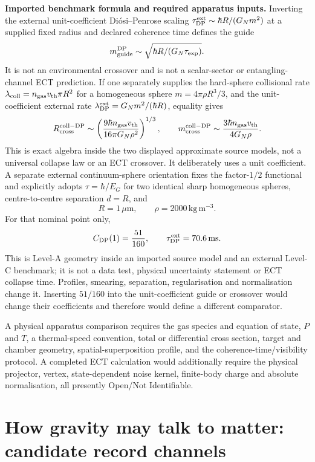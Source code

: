 \documentclass[11pt,a4paper]{article}
\begin{document}
\textbf{Imported benchmark formula and required apparatus inputs.}
Inverting the external unit-coefficient Di\'osi--Penrose scaling
$\tau_{\rm DP}^{\rm ext}\sim\hbar R/(G_Nm^2)$ at a supplied fixed radius and
declared coherence time defines the guide
\[
 m_{\rm guide}^{\rm DP}
 \sim \sqrt{\hbar R/(G_N\tau_{\rm exp})}.
\]
It is not an environmental crossover and is not a scalar-sector or
entangling-channel ECT prediction.  If one separately supplies the hard-sphere
collisional rate $\lambda_{\rm coll}=n_{\rm gas}v_{\rm th}\pi R^2$ for a
homogeneous sphere $m=4\pi\rho R^3/3$, and the unit-coefficient external rate
$\lambda_{\rm DP}^{\rm ext}=G_Nm^2/(\hbar R)$, equality gives
\[
 R_{\rm cross}^{\rm coll-DP}
 \sim\left(\frac{9\hbar n_{\rm gas}v_{\rm th}}
 {16\pi G_N\rho^2}\right)^{1/3},
 \qquad
 m_{\rm cross}^{\rm coll-DP}
 \sim\frac{3\hbar n_{\rm gas}v_{\rm th}}{4G_N\rho}.
\]
This is exact algebra inside the two displayed approximate source models, not
a universal collapse law or an ECT crossover.  It deliberately uses a unit
coefficient.  A separate external continuum-sphere orientation fixes the
factor-$1/2$ functional and explicitly adopts $\tau=\hbar/E_G$ for two identical sharp
homogeneous spheres, centre-to-centre separation $d=R$, and
\[ R=1\,\mu\mathrm m,\qquad \rho=2000\,\mathrm{kg\,m^{-3}}. \]
For that nominal point only,
\[
 C_{\rm DP}(1)=\frac{51}{160},\qquad
 \tau_{\rm DP}^{\rm ext}=70.6\,\mathrm{ms}.
\]
This is Level-A geometry inside an imported source model and an external
Level-C benchmark; it is not a data test, physical uncertainty statement or
ECT collapse time.  Profiles, smearing, separation, regularisation and
normalisation change it.  Inserting $51/160$ into the unit-coefficient guide
or crossover would change their coefficients and therefore would define a
different comparator.

A physical apparatus comparison requires the gas species and equation of
state, $P$ and $T$, a thermal-speed convention, total or differential cross
section, target and chamber geometry, spatial-superposition profile, and the
coherence-time/visibility protocol.  A completed ECT calculation would
additionally require the physical projector, vertex, state-dependent noise
kernel, finite-body charge and absolute normalisation, all presently
Open/Not Identifiable.


\section{How gravity may talk to matter: candidate record channels}
\label{sec:pop_mediator}
\end{document}
